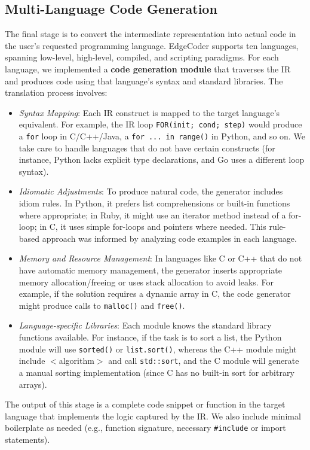 \documentclass[12pt]{article}
\begin{document}
\subsection{Multi-Language Code Generation}
The final stage is to convert the intermediate representation into actual code in the user’s requested programming language. EdgeCoder supports ten languages, spanning low-level, high-level, compiled, and scripting paradigms. For each language, we implemented a \textbf{code generation module} that traverses the IR and produces code using that language's syntax and standard libraries. The translation process involves:
\begin{itemize}
    \item \textit{Syntax Mapping}: Each IR construct is mapped to the target language’s equivalent. For example, the IR loop \texttt{FOR(init; cond; step)} would produce a \texttt{for} loop in C/C++/Java, a \texttt{for ... in range()} in Python, and so on. We take care to handle languages that do not have certain constructs (for instance, Python lacks explicit type declarations, and Go uses a different loop syntax).
    \item \textit{Idiomatic Adjustments}: To produce natural code, the generator includes idiom rules. In Python, it prefers list comprehensions or built-in functions where appropriate; in Ruby, it might use an iterator method instead of a for-loop; in C, it uses simple for-loops and pointers where needed. This rule-based approach was informed by analyzing code examples in each language.
    \item \textit{Memory and Resource Management}: In languages like C or C++ that do not have automatic memory management, the generator inserts appropriate memory allocation/freeing or uses stack allocation to avoid leaks. For example, if the solution requires a dynamic array in C, the code generator might produce calls to \texttt{malloc()} and \texttt{free()}.
    \item \textit{Language-specific Libraries}: Each module knows the standard library functions available. For instance, if the task is to sort a list, the Python module will use \texttt{sorted()} or \texttt{list.sort()}, whereas the C++ module might include $<$algorithm$>$ and call \texttt{std::sort}, and the C module will generate a manual sorting implementation (since C has no built-in sort for arbitrary arrays).
\end{itemize}
The output of this stage is a complete code snippet or function in the target language that implements the logic captured by the IR. We also include minimal boilerplate as needed (e.g., function signature, necessary \texttt{\#include} or import statements).
\end{document}
